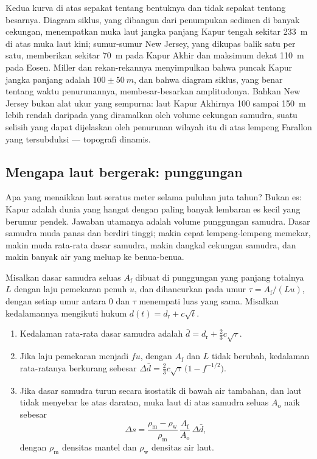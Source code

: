 Kedua kurva di atas sepakat tentang bentuknya dan tidak sepakat tentang besarnya. Diagram siklus, yang dibangun dari
penumpukan sedimen di banyak cekungan, menempatkan muka laut jangka panjang Kapur tengah
sekitar \qty{233}{m} di atas muka laut kini; sumur-sumur New Jersey, yang dikupas balik satu per satu, memberikan sekitar
\qty{70}{m} pada Kapur Akhir dan maksimum dekat \qty{110}{m} pada Eosen. Miller dan
rekan-rekannya menyimpulkan bahwa puncak Kapur jangka panjang adalah $100 \pm \qty{50}{m}$, dan bahwa
diagram siklus, yang benar tentang waktu penurunannya, membesar-besarkan amplitudonya. Bahkan New Jersey
bukan alat ukur yang sempurna: laut Kapur Akhirnya 100 sampai \qty{150}{m} lebih rendah daripada yang diramalkan oleh volume
cekungan samudra, suatu selisih yang dapat dijelaskan oleh penurunan wilayah itu di atas lempeng Farallon
yang tersubduksi --- topografi dinamis.

\subsection*{Mengapa laut bergerak: punggungan}

Apa yang menaikkan laut seratus meter selama puluhan juta tahun? Bukan es: Kapur
adalah dunia yang hangat dengan paling banyak lembaran es kecil yang berumur pendek. Jawaban utamanya adalah volume
punggungan samudra. Dasar samudra muda panas dan berdiri tinggi; makin cepat lempeng-lempeng memekar, makin
muda rata-rata dasar samudra, makin dangkal cekungan samudra, dan makin banyak air yang meluap ke
benua-benua.

\begin{proposition}\label{prop:b2:phanerozoic-earth:ridge}
Misalkan dasar samudra seluas $A_{\text{f}}$ dibuat di punggungan yang panjang totalnya $L$ dengan laju
pemekaran penuh $u$, dan dihancurkan pada umur $\tau = A_{\text{f}}/(Lu)$, dengan setiap umur antara 0
dan $\tau$ menempati luas yang sama. Misalkan kedalamannya mengikuti hukum $d(t) = d_{\text{r}} + c\sqrt t$.
\begin{enumerate}
  \item Kedalaman rata-rata dasar samudra adalah $\bar d = d_{\text{r}} + \tfrac23 c\sqrt\tau$.
  \item Jika laju pemekaran menjadi $fu$, dengan $A_{\text{f}}$ dan $L$ tidak berubah, kedalaman
        rata-ratanya berkurang sebesar $\Delta\bar d = \tfrac23 c\sqrt\tau\,\bigl(1 - f^{-1/2}\bigr)$.
  \item Jika dasar samudra turun secara isostatik di bawah air tambahan, dan laut tidak menyebar
        ke atas daratan, muka laut di atas samudra seluas $A_{\text{o}}$ naik sebesar
        \[
        \Delta s = \frac{\rho_{\text{m}} - \rho_{\text{w}}}{\rho_{\text{m}}}\,
        \frac{A_{\text{f}}}{A_{\text{o}}}\,\Delta\bar d ,
        \]
        dengan $\rho_{\text{m}}$ densitas mantel dan $\rho_{\text{w}}$ densitas air laut.
\end{enumerate}
\end{proposition}

